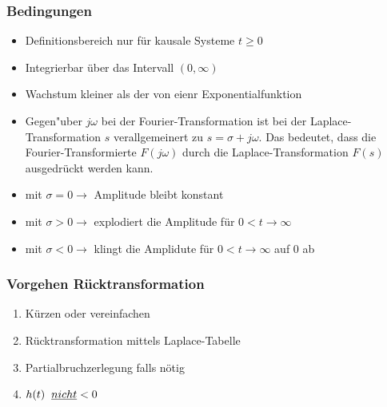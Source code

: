 \begin{multicols}{2}
\begin{center}
\subsubsection{Bedingungen}
\begin{itemize}
		\item Definitionsbereich nur für kausale Systeme $t\geq 0$\\
		\item Integrierbar über das Intervall $(0,\infty)$\\
		\item Wachstum kleiner als der von eienr Exponentialfunktion\\ 
		\item Gegen"uber $j\omega$ bei der Fourier-Transformation ist bei der
			Laplace-Transformation $s$ verallgemeinert zu $s=\sigma + j\omega$. Das
			bedeutet, dass die Fourier-Transformierte $F(j\omega)$ durch die
			Laplace-Transformation $F(s)$ ausgedr\"uckt werden kann. \\
		\item mit $\sigma = 0 \rightarrow$ Amplitude bleibt konstant\\
		\item mit $\sigma > 0 \rightarrow$ explodiert die Amplitude f\"ur $0 < t \rightarrow \infty$ \\
		\item mit $\sigma < 0 \rightarrow$ klingt die Amplidute für $0 < t \rightarrow \infty$ auf $0$ ab
\end{itemize}

	\subsubsection{Vorgehen Rücktransformation}
		\begin{enumerate}
			\item Kürzen oder vereinfachen
			\item Rücktransformation mittels Laplace-Tabelle
			\item Partialbruchzerlegung falls nötig
			\item $h(t)\hspace{0.2cm}\underline{nicht} < 0$
		\end{enumerate}
	\end{center}
\end{multicols}


